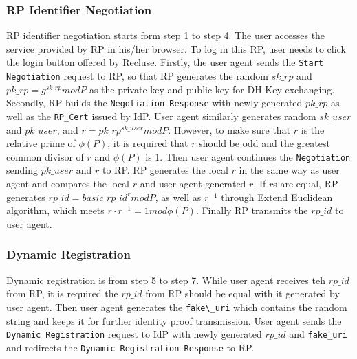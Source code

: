 

\subsubsection{RP Identifier Negotiation}
RP identifier negotiation starts form step 1 to step 4. The user accesses the service provided by RP in his/her browser. To log in this RP, user needs to click the login button offered by Recluse. 
Firstly, the user agent sends the \verb+Start Negotiation+ request to RP, so that RP generates the random $sk\_rp$ and $pk\_rp=g^{sk\_rp}modP$ as the private key and public key for DH Key exchanging. 
Secondly, RP builds the \verb+Negotiation Response+ with newly generated $pk\_rp$ as well as the \verb+RP_Cert+ issued by IdP. User agent similarly generates random $sk\_user$ and $pk\_user$, and $r=pk\_rp^{sk\_user}modP$. However, to make sure that $r$ is the relative prime of $\phi(P)$, it is required that $r$ should be odd and the greatest common divisor of $r$ and $\phi(P)$ is 1. 
Then user agent continues the \verb+Negotiation+ sending $pk\_user$ and $r$ to RP. RP generates the local $r$ in the same way as user agent and compares the local $r$ and user agent generated $r$. If $r$s are equal, RP generates $rp\_id=basic\_rp\_id^rmodP$, as well as $r^{-1}$ through Extend Euclidean algorithm, which meets $r\cdot r^{-1}=1mod\phi(P)$.
Finally RP transmits the $rp\_id$ to user agent. 
\subsubsection{Dynamic Registration}
Dynamic registration is from step 5 to step 7. While user agent receives teh $rp\_id$ from RP, it is required the $rp\_id$ from RP should be equal with it generated by user agent. Then user agent generates the \verb+fake\_uri+ which contains the random string and keeps it for further identity proof transmission. User agent sends the \verb+Dynamic Registration+ request to IdP with newly generated $rp\_id$ and \verb+fake_uri+ and redirects the \verb+Dynamic Registration Response+ to RP.
